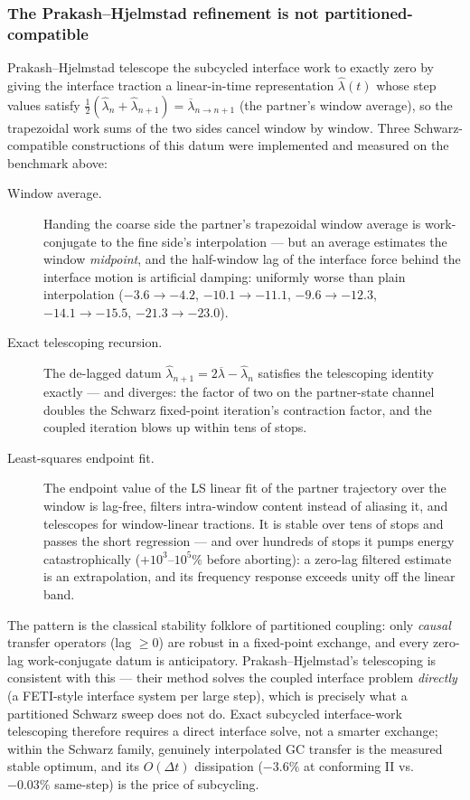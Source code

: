 \documentclass[11pt]{article}
\begin{document}
\subsubsection*{The Prakash--Hjelmstad refinement is not partitioned-compatible}

Prakash--Hjelmstad telescope the subcycled interface work to exactly zero
by giving the interface traction a linear-in-time representation
$\hat\lambda(t)$ whose step values satisfy
$\tfrac12(\hat\lambda_n + \hat\lambda_{n+1}) = \overline{\lambda}_{n \to
n+1}$ (the partner's window average), so the trapezoidal work sums of the
two sides cancel window by window. Three Schwarz-compatible constructions
of this datum were implemented and measured on the benchmark above:

\begin{description}
  \item[Window average.] Handing the coarse side the partner's trapezoidal
  window average is work-conjugate to the fine side's interpolation ---
  but an average estimates the window \emph{midpoint}, and the half-window
  lag of the interface force behind the interface motion is artificial
  damping: uniformly worse than plain interpolation ($-3.6 \to -4.2$,
  $-10.1 \to -11.1$, $-9.6 \to -12.3$, $-14.1 \to -15.5$, $-21.3 \to
  -23.0$).
  \item[Exact telescoping recursion.] The de-lagged datum
  $\hat\lambda_{n+1} = 2\overline{\lambda} - \hat\lambda_n$ satisfies the
  telescoping identity exactly --- and diverges: the factor of two on the
  partner-state channel doubles the Schwarz fixed-point iteration's
  contraction factor, and the coupled iteration blows up within tens of
  stops.
  \item[Least-squares endpoint fit.] The endpoint value of the LS linear
  fit of the partner trajectory over the window is lag-free, filters
  intra-window content instead of aliasing it, and telescopes for
  window-linear tractions. It is stable over tens of stops and passes the
  short regression --- and over hundreds of stops it pumps energy
  catastrophically ($+10^3$--$10^5\%$ before aborting): a zero-lag
  filtered estimate is an extrapolation, and its frequency response
  exceeds unity off the linear band.
\end{description}

The pattern is the classical stability folklore of partitioned coupling:
only \emph{causal} transfer operators (lag $\ge 0$) are robust in a
fixed-point exchange, and every zero-lag work-conjugate datum is
anticipatory. Prakash--Hjelmstad's telescoping is consistent with this ---
their method solves the coupled interface problem \emph{directly} (a
FETI-style interface system per large step), which is precisely what a
partitioned Schwarz sweep does not do. Exact subcycled interface-work
telescoping therefore requires a direct interface solve, not a smarter
exchange; within the Schwarz family, genuinely interpolated GC transfer is
the measured stable optimum, and its $O(\Delta t)$ dissipation
($-3.6\%$ at conforming II vs.\ $-0.03\%$ same-step) is the price of
subcycling.
\end{document}
